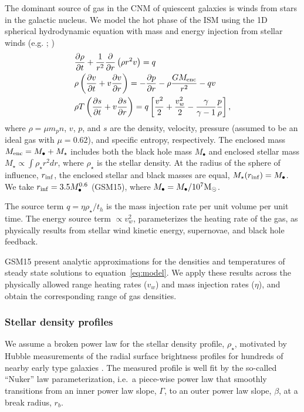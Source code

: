 \documentclass[usenatbib,fleqn]{mnras}
\newcommand{\Mbh}[1][]{M_{\bullet}}
\newcommand{\Menc}{M_{\rm enc}}
\renewcommand{\th}{t_h}
\newcommand{\Msun}{{\rm M_\odot}}
\begin{document}
The dominant source of gas in the CNM of quiescent galaxies is winds
from stars in the galactic nucleus. We model the hot phase of the ISM
using the 1D spherical hydrodynamic equation with mass and energy
injection from stellar winds (e.g. \citealt{Holzer+1970};
\citealt{Quataert2004})
\begin{align}
  &\frac{\partial \rho}{\partial t}+\frac{1}{r^2}\frac{\partial}{\partial r}\left(\rho r^2 v\right)=q \label{eq:drhodt}\\
  &\rho \left(\frac{\partial v}{\partial t} + v\frac{\partial
      v}{\partial r}\right) =-\frac{\partial p}{\partial r}- \rho\frac{GM_{\rm enc}}{r^{2}} -q v \label{eq:dvdt}\\
  &\rho T\left(\frac{\partial s}{\partial t} + v\frac{\partial
      s}{\partial
      r}\right)=q\left[\frac{v^2}{2}+\frac{v_w^2}{2}-\frac{\gamma}{\gamma-1}
    \frac{p}{\rho} \right] ,
\label{eq:model}
\end{align}
where $\rho = \mu m_p n$, $v$, $p$, and $s$ are the density, velocity,
pressure (assumed to be an ideal gas with $\mu = 0.62$), and specific
entropy, respectively.  The enclosed mass $\Menc = M_{\bullet} +
M_{\star}$ includes both the black hole mass $M_{\bullet}$ and
enclosed stellar mass $M_{\star} \propto \int \rho_{\star}r^{2}dr$,
where $\rho_{\star}$ is the stellar density. At the radius of the
sphere of influence, $r_{\rm inf}$, the enclosed stellar and black
masses are equal, $M_{\star}(r_{\rm inf})=\Mbh$.  We take $r_{\rm
  inf}=3.5 \Mbh[,7]^{0.6}$ (GSM15), where $\Mbh[,7]=\Mbh/10^7 \Msun$.

The source term $q =\eta \rho_\star/\th$ is the mass injection
rate per unit volume per unit time. The energy source term $\propto
v_w^{2}$, parameterizes the heating rate of the gas, as physically
results from stellar wind kinetic energy, supernovae, and black hole
feedback.

GSM15 present analytic approximations for the
densities and temperatures of steady state solutions to
equation~\eqref{eq:model}. We apply these results across the
physically allowed range heating rates ($v_w$) and mass injection
rates ($\eta$), and obtain the corresponding range of gas densities.

\subsubsection{Stellar density profiles}
We assume a broken power law for the stellar density profile,
$\rho_{\star}$, motivated by Hubble measurements of the radial surface
brightness profiles for hundreds of nearby early type galaxies
\citep{Lauer+2007}.  The measured profile is well fit by the so-called
``Nuker'' law parameterization, i.e.~a piece-wise power law that smoothly
transitions from an inner power law slope, $\Gamma$, to an outer power
law slope, $\beta$, at a break radius, $r_b$.
\end{document}
